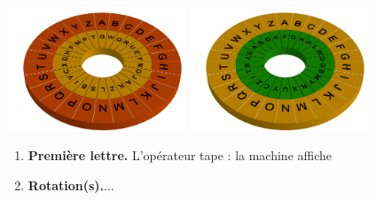 \begin{frame}


{\centering 
            \includegraphics[width=0.4\textwidth]{figures/Enigma_0_bi_unesurdeux.png} 
            \qquad 
            \includegraphics[width=0.4\textwidth]{figures/Enigma_0_tri_deuxsurdeux.png} 

}


\pause

\begin{enumerate}%
%   
%   

  \item \textbf{Première lettre.} L'opérateur tape  : 
  la machine affiche 
\pause

  \item \textbf{Rotation(s).}... 
\end{enumerate}

\end{frame}
% 

